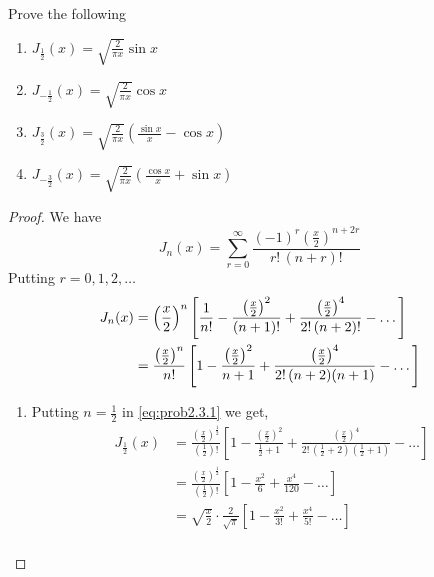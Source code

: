 \documentclass[../main-sheet.tex]{subfiles}
\begin{document}
\begin{prob}
    Prove the following
    \begin{enumerate}[label={(\roman*)}]
        \item $ J_{\frac{1}{2} }(x)=\sqrt{\frac{2}{\pi x}} \sin x $
        \item $ J_{-\frac{1}{2}}(x)=\sqrt{\frac{2}{\pi x}} \cos x $
        \item $ J_{\frac{3}{2}}(x)=\sqrt{\frac{2}{\pi x}} \left( \frac{\sin x}{x} -\cos x\right) $
        \item $ J_{-\frac{3}{2}}(x)=\sqrt{\frac{2}{\pi x}} \left( \frac{\cos x}{x} +\sin x\right) $
    \end{enumerate}
\end{prob}
\begin{proof}
    We have 
    \[
        J_n(x)=\sum_{r=0}^\infty\frac{(-1)^r\left( \frac{x}{2} \right)^{n+2r}}{r!\,(n+r)!}
    \]
    Putting $ r=0,1,2,\dots $
    \begin{align}
        J_n(x)&=\left( \frac{x}{2} \right)^n \left[ \frac{1}{n!}-\frac{\left( \frac{x}{2} \right)^2}{(n+1)!}+\frac{\left( \frac{x}{2} \right)^4}{2!\,(n+2)!}-\dots \right]\notag\\
        &=\frac{\left( \frac{x}{2} \right)^n}{n!} \left[ 1-\frac{\left( \frac{x}{2} \right)^2}{n+1}+\frac{\left( \frac{x}{2} \right)^4}{2!\,(n+2)(n+1)}-\dots \right]\label{eq:prob2.3.1}
    \end{align}
    \begin{enumerate}[label={(\roman*)}]
        \item Putting $ n=\frac{1}{2} $ in \eqref{eq:prob2.3.1} we get,
        \begin{align*}
            J_{\frac{1}{2}}(x )&=\frac{\left( \frac{x}{2} \right)^{\frac{1}{2}}}{\left( \frac{1}{2} \right)!} \left[ 1-\frac{\left( \frac{x}{2} \right)^2}{\frac{1}{2}+1}+\frac{\left( \frac{x}{2} \right)^4}{2!\,\left(\frac{1}{2}+2\right)\left({\frac{1}{2}}+1\right)}-\dots \right]\\
            &=\frac{\left( \frac{x}{2} \right)^{\frac{1}{2}}}{\left( \frac{1}{2} \right)!} \left[ 1-\frac{x^2}{6}+\frac{x^4}{120}-\dots \right]\\
            &=\sqrt{\frac{x}{2}}\cdot\frac{2}{\sqrt{\pi}} \left[ 1-\frac{x^2}{3!}+\frac{x^4}{5!}-\dots \right]\\

\end{align*}
\end{enumerate}
\end{proof}
\end{document}

